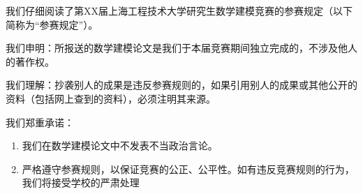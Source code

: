 \documentclass[bwprint]{suesmmthesis}
\begin{document}
    \thispagestyle{empty}
    \begin{center}
        
        \vskip0.25cm
        
    \end{center}
    \begin{flushleft}
        \setlength{\baselineskip}{1.2\baselineskip}

        \hspace{2em}我们仔细阅读了第XX届上海工程技术大学研究生数学建模竞赛的参赛规定（以下简称为“参赛规定”）。

        \hspace{2em}我们申明：所报送的数学建模论文是我们于本届竞赛期间独立完成的，不涉及他人的著作权。

        \hspace{2em}我们理解：抄袭别人的成果是违反参赛规则的，如果引用别人的成果或其他公开的资料（包括网上查到的资料），必须注明其来源。

        \hspace{2em}我们郑重承诺：
        \begin{enumerate}[label=(\arabic*)]
            \item 我们在数学建模论文中不发表不当政治言论。
            \item 严格遵守参赛规则，以保证竞赛的公正、公平性。如有违反竞赛规则的行为，我们将接受学校的严肃处理
        \end{enumerate}
    \end{flushleft}

    \vskip1.0cm
\end{document}
